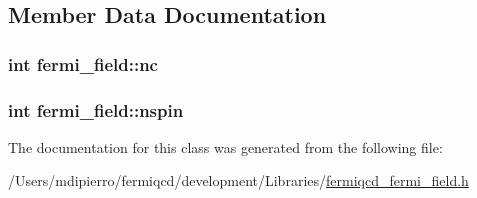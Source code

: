 \subsection{Member Data Documentation}
\hypertarget{classfermi__field_a10875de82035b0689d0229ea80c8f089}{
\subsubsection[{nc}]{\setlength{\rightskip}{0pt plus 5cm}int {\bf fermi\_\-field::nc}}}
\label{classfermi__field_a10875de82035b0689d0229ea80c8f089}
\hypertarget{classfermi__field_a664546510ce0d76d234d6526c3c0282b}{
\subsubsection[{nspin}]{\setlength{\rightskip}{0pt plus 5cm}int {\bf fermi\_\-field::nspin}}}
\label{classfermi__field_a664546510ce0d76d234d6526c3c0282b}


The documentation for this class was generated from the following file:\begin{DoxyCompactItemize}
\item 
/Users/mdipierro/fermiqcd/development/Libraries/\hyperlink{fermiqcd__fermi__field_8h}{fermiqcd\_\-fermi\_\-field.h}\end{DoxyCompactItemize}
